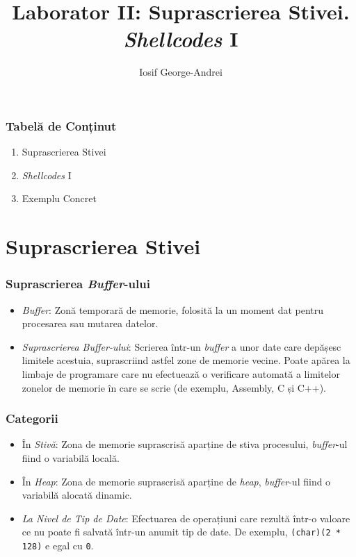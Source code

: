 \documentclass[xcolor={table}]{beamer}
\title{Laborator II: Suprascrierea Stivei. \textit{Shellcodes} I}
\subtitle{}
\author{Iosif George-Andrei}
\begin{document}
    \setcounter{showProgressBar}{0}
	\setcounter{showSlideNumbers}{0}
	\frame{\titlepage}

	\begin{frame}
		\frametitle{Tabelă de Conținut}\pause
		\begin{enumerate}[<+->]
			\item Suprascrierea Stivei
			\item \textit{Shellcodes} I
			\item Exemplu Concret
		\end{enumerate}
	\end{frame}

	\setcounter{framenumber}{0}
	\setcounter{showProgressBar}{1}
	\setcounter{showSlideNumbers}{1}
	\section{Suprascrierea Stivei}

	\begin{frame}
		\frametitle{Suprascrierea \textit{Buffer}-ului}\pause
		\begin{itemize}[<+->]
			\item \textit{Buffer}: Zonă temporară de memorie, folosită la un moment dat pentru procesarea sau mutarea datelor.
			\item \textit{Suprascrierea Buffer-ului}: Scrierea într-un \textit{buffer} a unor date care depășesc limitele acestuia, suprascriind astfel zone de memorie vecine. Poate apărea la limbaje de programare care nu efectuează o verificare automată a limitelor zonelor de memorie în care se scrie (de exemplu, Assembly, C și C++).
		\end{itemize}
	\end{frame}
	
	\begin{frame}
		\frametitle{Categorii}\pause
		\begin{itemize}[<+->]
			\item În \textit{Stivă}: Zona de memorie suprascrisă aparține de stiva procesului, \textit{buffer}-ul fiind o variabilă locală.
			\item În \textit{\textit{Heap}}: Zona de memorie suprascrisă aparține de \textit{heap}, \textit{buffer}-ul fiind o variabilă alocată dinamic.
			\item \textit{La Nivel de Tip de Date}: Efectuarea de operațiuni care rezultă într-o valoare ce nu poate fi salvată într-un anumit tip de date. De exemplu, \texttt{(char)(2 * 128)} e egal cu \texttt{0}.
		\end{itemize}
	\end{frame}
	
\end{document}

